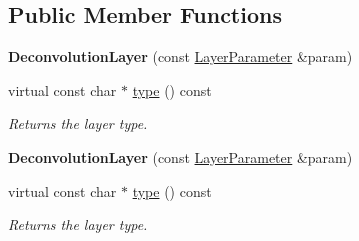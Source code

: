 \subsection*{Public Member Functions}
\begin{DoxyCompactItemize}
\item 
\mbox{\label{classcaffe_1_1_deconvolution_layer_a48f1d8c75f9fb83d4af78a84cff187e8}} 
{\bfseries Deconvolution\+Layer} (const \mbox{\hyperlink{classcaffe_1_1_layer_parameter}{Layer\+Parameter}} \&param)
\item 
\mbox{\label{classcaffe_1_1_deconvolution_layer_acc0d5ad1c1c4f20e6bdca42fc37fbfe3}} 
virtual const char $\ast$ \mbox{\hyperlink{classcaffe_1_1_deconvolution_layer_acc0d5ad1c1c4f20e6bdca42fc37fbfe3}{type}} () const
\begin{DoxyCompactList}\small\item\em Returns the layer type. \end{DoxyCompactList}\item 
\mbox{\label{classcaffe_1_1_deconvolution_layer_a48f1d8c75f9fb83d4af78a84cff187e8}} 
{\bfseries Deconvolution\+Layer} (const \mbox{\hyperlink{classcaffe_1_1_layer_parameter}{Layer\+Parameter}} \&param)
\item 
\mbox{\label{classcaffe_1_1_deconvolution_layer_acc0d5ad1c1c4f20e6bdca42fc37fbfe3}} 
virtual const char $\ast$ \mbox{\hyperlink{classcaffe_1_1_deconvolution_layer_acc0d5ad1c1c4f20e6bdca42fc37fbfe3}{type}} () const
\begin{DoxyCompactList}\small\item\em Returns the layer type. \end{DoxyCompactList}\end{DoxyCompactItemize}
